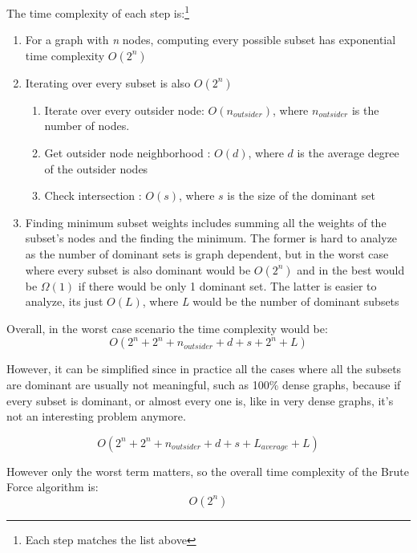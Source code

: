 \documentclass[mirror,times]{revdetua}
\begin{document}
The time complexity of each step is:\footnote{Each step matches the list above}\begin{enumerate}
  \item For a graph with \textit{n} nodes, computing every possible subset has
  exponential time complexity $O(2^n)$ 
  \item Iterating over every subset is also $O(2^n)$\begin{enumerate}
    \item Iterate over every outsider node: $O(n_{outsider})$, where $n_{outsider}$ is the number of nodes.
    \item Get outsider node neighborhood : $O(d)$, where $d$ is the average
    degree of the outsider nodes
    \item Check intersection : $O(s)$, where $s$ is the size of the dominant set
  \end{enumerate}
  \item Finding minimum subset weights includes summing all the weights of the subset's nodes
  and the finding the minimum. The former is hard to analyze as the number of
  dominant sets is graph dependent, but in the worst case where every subset is
  also dominant would be $O(2^n)$ and in the best would be $\Omega(1)$ if there would
  be only 1 dominant set. The latter is easier to analyze, its just $O(L)$,
  where \textit{L} would be the number of dominant subsets
  
\end{enumerate}

Overall, in the worst case scenario the time complexity would be:
\begin{equation}
  O(2^n+2^n+n_{outsider}+d+s+2^n+L)
\end{equation}

However, it can be simplified since in practice all the cases where all the
subsets are dominant are usually not meaningful, such as 100\% dense
graphs, because if every subset is dominant, or almost every one is, like in very
dense graphs, it's not an interesting problem anymore.

\begin{equation}
  O(2^n+2^n+n_{outsider}+d+s+L_{average}+L)
\end{equation}

However only the worst term matters, so the overall time complexity of the Brute
Force algorithm is:
\begin{equation}
  O(2^n)
\end{equation}
\end{document}
